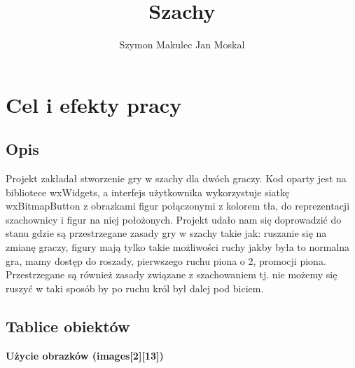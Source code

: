\documentclass[]{report}
\title{Szachy}
\author{Szymon Makulec Jan Moskal}
\begin{document}
\maketitle
\section*{Cel i efekty pracy}


\subsection*{Opis}
\begin{flushleft}
Projekt zakładał stworzenie gry w szachy dla dwóch graczy. Kod oparty jest na bibliotece wxWidgets, a interfejs użytkownika wykorzystuje siatkę wxBitmapButton z obrazkami figur połączonymi z kolorem tła, do reprezentacji szachownicy i figur na niej położonych. Projekt udało nam się doprowadzić do stanu gdzie są przestrzegane zasady gry w szachy takie jak: ruszanie się na zmianę graczy, figury mają tylko takie możliwości ruchy jakby była to normalna gra, mamy dostęp do roszady, pierwszego ruchu piona o 2, promocji piona. Przestrzegane są również zasady związane z szachowaniem tj. nie możemy się ruszyć w taki sposób by po ruchu król był dalej pod biciem.
\end{flushleft}
\subsection*{Tablice obiektów}

\textbf{Użycie obrazków (images[2][13])}
\end{document}
